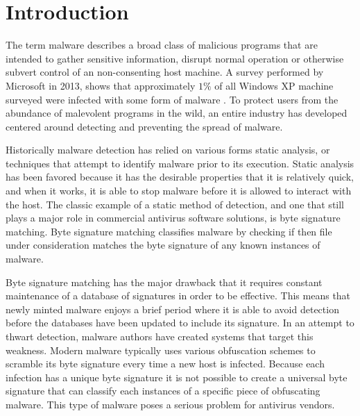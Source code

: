 \chapter{Introduction}


    The term malware describes a broad class of malicious programs that are
    intended to gather sensitive information, disrupt normal operation or
    otherwise subvert control of an non-consenting host machine. A survey
    performed by Microsoft in 2013, shows that approximately $1\%$ of all
    Windows XP machine surveyed were infected with some form of malware
    \cite{infect_rates}. To protect users from the abundance of malevolent
    programs in the wild, an entire industry has developed centered around
    detecting and preventing the spread of malware.


    Historically malware detection has relied on various forms static analysis,
    or techniques that attempt to identify malware prior to its execution.
    Static analysis has been favored because it has the desirable properties
    that it is relatively quick, and when it works, it is able to stop malware
    before it is allowed to interact with the host. The classic example of a
    static method of detection, and one that still plays a major role in
    commercial antivirus software solutions, is byte signature matching. Byte
    signature matching classifies malware by checking if then file under
    consideration matches the byte signature of any known instances of malware.


    Byte signature matching has the major drawback that it requires constant
    maintenance of a database of signatures in order to be effective. This means
    that newly minted malware enjoys a brief period where it is able to avoid
    detection before the databases have been updated to include its signature.
    In an attempt to thwart detection, malware authors have created systems that
    target this weakness. Modern malware typically uses various obfuscation
    schemes to scramble its byte signature every time a new host is infected.
    Because each infection has a unique byte signature it is not possible to
    create a universal byte signature that can classify each instances of a
    specific piece of obfuscating malware. This type of malware poses a serious
    problem for antivirus vendors.

